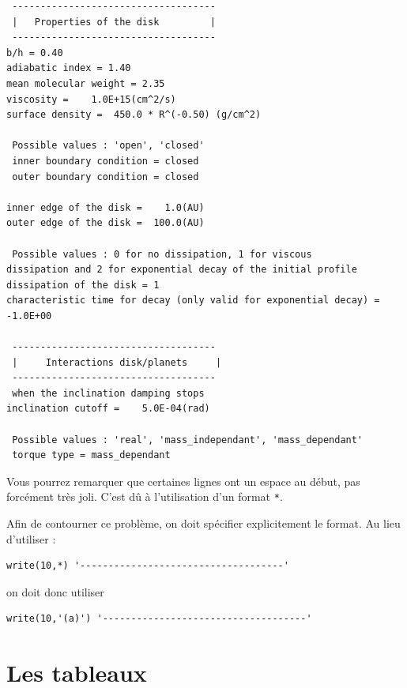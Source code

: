 \documentclass[a4paper,twoside]{article}
\begin{document}
\begin{verbatim}
 ------------------------------------
 |   Properties of the disk         |
 ------------------------------------
b/h = 0.40
adiabatic index = 1.40
mean molecular weight = 2.35
viscosity =    1.0E+15(cm^2/s)
surface density =  450.0 * R^(-0.50) (g/cm^2)

 Possible values : 'open', 'closed'
 inner boundary condition = closed
 outer boundary condition = closed

inner edge of the disk =    1.0(AU)
outer edge of the disk =  100.0(AU)

 Possible values : 0 for no dissipation, 1 for viscous 
dissipation and 2 for exponential decay of the initial profile
dissipation of the disk = 1
characteristic time for decay (only valid for exponential decay) =   -1.0E+00

 ------------------------------------
 |     Interactions disk/planets     |
 ------------------------------------
 when the inclination damping stops
inclination cutoff =    5.0E-04(rad)

 Possible values : 'real', 'mass_independant', 'mass_dependant'
 torque type = mass_dependant
\end{verbatim}

\begin{remarque}
Vous pourrez remarquer que certaines lignes ont un espace au début, pas forcément très joli. C'est dû à l'utilisation d'un format \texttt{*}.

Afin de contourner ce problème, on doit spécifier explicitement le format. Au lieu d'utiliser : 
\begin{verbatim}
write(10,*) '------------------------------------'
\end{verbatim}
on doit donc utiliser 
\begin{verbatim}
write(10,'(a)') '------------------------------------'
\end{verbatim}
\end{remarque}



\section{Les tableaux}
\end{document}
